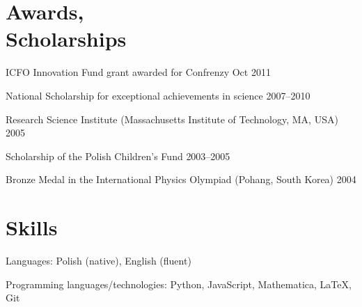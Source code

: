 \documentclass[margin,line]{resume}
\begin{document}
\begin{resume}

    \section{\mysidestyle Awards,\\Scholarships}
    \begin{list2}
    	\item ICFO Innovation Fund grant awarded for Confrenzy \hfill { Oct 2011}
        \item National Scholarship for exceptional achievements in science \hfill { 2007--2010}
        \item Research Science Institute (Massachusetts Institute of Technology, MA, USA) \hfill { 2005}
        \item Scholarship of the Polish Children's Fund \hfill { 2003--2005}
        \item Bronze Medal in the International Physics Olympiad (Pohang, South Korea) \hfill { 2004}
    \end{list2}


    \section{\mysidestyle Skills}
    \begin{list2}
        \item Languages: Polish (native), English (fluent)
        \item Programming languages/technologies: Python, JavaScript, Mathematica, LaTeX, Git
    \end{list2}


\end{resume}
\end{document}

